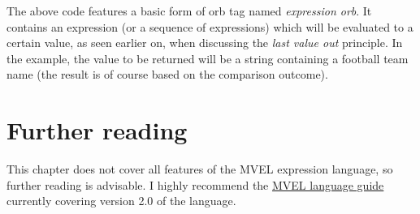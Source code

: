 The above code features a basic form of orb tag named \emph{expression orb}. It contains an expression (or a sequence of expressions) which will be evaluated to a certain value, as seen earlier on, when discussing the \emph{last value out} principle. In the example, the value to be returned will be a string containing a football team name (the result is of course based on the comparison outcome).

\section{Further reading}
\label{sec:mvelfurtherreading}

This chapter does not cover all features of the MVEL expression language, so further reading is advisable. I highly recommend the \href{http://mvel.documentnode.com/}{MVEL language guide} currently covering version 2.0 of the language.
